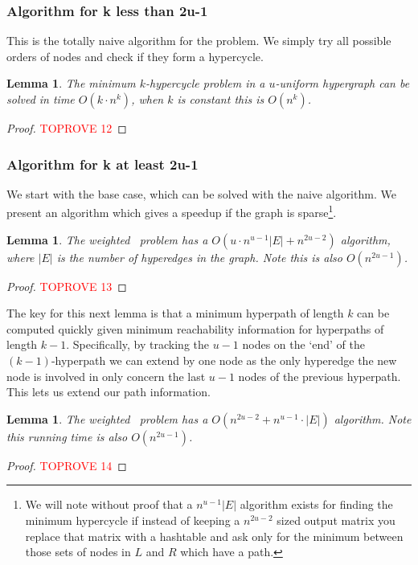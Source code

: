 \documentclass[11pt,letterpaper,pdftex]{article}
\newtheorem{lemma}[theorem]{Lemma}
\begin{document}
\subsubsection{Algorithm for k less than 2u-1}
This is the totally naive algorithm for the problem. We simply try all possible orders of nodes and check if they form a hypercycle.

\begin{lemma}
    The minimum $k$-hypercycle problem in a $u$-uniform hypergraph can be solved in time $O(k \cdot n^k)$, when $k$ is constant this is $O(n^k)$. 
    \label{lem:shortweightedkhypercyclealg}
\end{lemma}
\begin{proof}\textcolor{red}{TOPROVE 12}\end{proof}

\subsubsection{Algorithm for k at least 2u-1}
We start with the base case, which can be solved with the naive algorithm. We present an algorithm which gives a speedup if the graph is sparse\footnote{We will note without proof that a $n^{u-1} |E|$ algorithm exists for finding the minimum hypercycle if instead of keeping a $n^{2u-2}$ sized output matrix you replace that matrix with a hashtable and ask only for the minimum between those sets of nodes in $L$ and $R$ which have a path.}. 

\begin{lemma}
    The weighted \uCLR~problem has a $O(u \cdot n^{u-1}|E| + n^{2u-2})$ algorithm, where $|E|$ is the number of hyperedges in the graph. Note this is also $O(n^{2u-1})$.
    \label{lem:weighteduCLRAlg}
\end{lemma}
\begin{proof}\textcolor{red}{TOPROVE 13}\end{proof}


The key for this next lemma is that a minimum hyperpath of length $k$ can be computed quickly given minimum reachability information for hyperpaths of length $k-1$. Specifically, by tracking the $u-1$ nodes on the `end' of the $(k-1)$-hyperpath we can extend by one node as the only hyperedge the new node is involved in only concern the last $u-1$ nodes of the previous hyperpath. This lets us extend our path information. 
\begin{lemma}
    The weighted ~problem has a $O(n^{2u-2} + n^{u-1} \cdot |E|)$ algorithm. Note this running time is also $O(n^{2u-1})$.
    
    \label{lem:weightedukECLRAlg}
\end{lemma}
\begin{proof}\textcolor{red}{TOPROVE 14}\end{proof}
\end{document}

